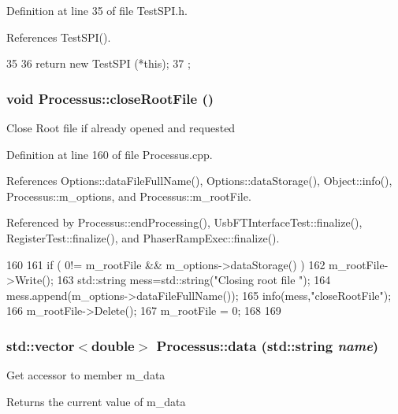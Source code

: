 Definition at line 35 of file TestSPI.h.

References TestSPI().


\begin{DoxyCode}
35                   {
36     return new TestSPI (*this);
37   };
\end{DoxyCode}
\hypertarget{classProcessus_a2f3c41e99da4c738ea3d8f7b0d20a665}{
\subsubsection[{closeRootFile}]{\setlength{\rightskip}{0pt plus 5cm}void Processus::closeRootFile ()}}
\label{classProcessus_a2f3c41e99da4c738ea3d8f7b0d20a665}
Close Root file if already opened and requested 

Definition at line 160 of file Processus.cpp.

References Options::dataFileFullName(), Options::dataStorage(), Object::info(), Processus::m\_\-options, and Processus::m\_\-rootFile.

Referenced by Processus::endProcessing(), UsbFTInterfaceTest::finalize(), RegisterTest::finalize(), and PhaserRampExec::finalize().


\begin{DoxyCode}
160                                 {
161   if ( 0!= m_rootFile && m_options->dataStorage() ){
162     m_rootFile->Write();
163         std::string mess=std::string("Closing root file ");
164         mess.append(m_options->dataFileFullName());
165         info(mess,"closeRootFile");
166     m_rootFile->Delete();
167     m_rootFile = 0;
168   }
169 }
\end{DoxyCode}
\hypertarget{classProcessus_abf4d91fb36707e1d50178bab12d21ae9}{
\subsubsection[{data}]{\setlength{\rightskip}{0pt plus 5cm}std::vector$<$double$>$ Processus::data (std::string {\em name})}}
\label{classProcessus_abf4d91fb36707e1d50178bab12d21ae9}
Get accessor to member m\_\-data \begin{DoxyReturn}{Returns}
the current value of m\_\-data 
\end{DoxyReturn}


